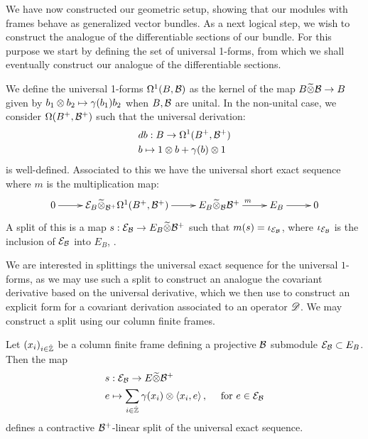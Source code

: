 We have now constructed our geometric setup, showing that our modules with frames behave as generalized vector bundles. As a next logical step, we wish to construct the analogue of the differentiable sections of our bundle. For this purpose we start by defining the set of universal 1-forms, from which we shall eventually construct our analogue of the differentiable sections.  
\begin{definition}
	We define the universal 1-forms $\Omega^1(B,\mathcal{B})$ as the kernel of the map $B\widetilde{\otimes} \mathcal{B}\to B$ given by $b_1\otimes b_2\mapsto \gamma(b_1)b_2$ when $B,\mathcal{B}$ are unital. In the non-unital case, we consider $\Omega(B^+,\mathcal{B}^+)$ such that the universal derivation:
	\begin{align*}
		&db:B\to \Omega^1(B^+,\mathcal{B}^+) \\
		&b\mapsto 1\otimes b+\gamma(b)\otimes 1
	\end{align*}
	is well-defined. 
	Associated to this we have the universal short exact sequence where $m$ is the multiplication map:
	\begin{align*}
	\xymatrix{
		0 \ar[r] & \E_B \optens_{\B^+}\Omega^1(B^+,\B^+) \ar[r] & E_B\optens_{\B} \B^+ \ar[r]^m & E_B \ar[r] & 0 
	}
	\end{align*}
	A split of this is a map $s:\mathcal{E}_{\mathcal{B}}\to E_B\widetilde{\otimes} \mathcal{B}^+$ such that $m(s)=\iota_{\mathcal{E}_{\mathcal{B}}}$, where $\iota_{\mathcal{E}_{\mathcal{B}}}$ is the inclusion of $\mathcal{E}_{\mathcal{B}}$ into $E_B$, \cite[Proposition 2.22]{suijlekom}. 
\end{definition}
We are interested in splittings the universal exact sequence for the universal $1$-forms, as we may use such a split to construct an analogue the covariant derivative based on the universal derivative, which we then use to construct an explicit form for a covariant derivation associated to an operator $\mathscr{D}$. 
We may construct a split using our column finite frames. 
\begin{lemma}
	Let $(x_i)_{i\in \hat{\mathbb{Z}}}$ be a column finite frame defining a projective $\mathcal{B}$ submodule $\mathcal{E}_{\mathcal{B}} \subset E_B$. Then the map 
	\begin{align*}
		&s:\mathcal{E}_{\mathcal{B}}\to E\widetilde{\otimes} \mathcal{B}^+ \\
		&e\mapsto \sum_{i\in \hat{\mathbb{Z}}} \gamma(x_i)\otimes \left \langle x_i,e \right \rangle, \quad \text{ for } e\in \mathcal{E}_{\mathcal{B}}
	\end{align*}
	defines a contractive $\mathcal{B}^+$-linear split of the universal exact sequence. 
\end{lemma}
